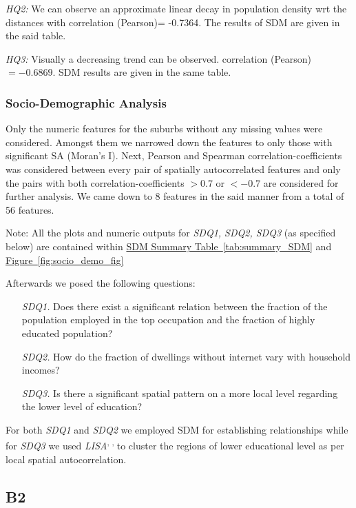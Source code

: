 \documentclass[
	a4paper, %
	10pt, %
	unnumberedsections, %
	twoside, %
]{LTJournalArticle}
\begin{document}
\textit{HQ2:} We can observe an approximate linear decay in population density wrt the distances with correlation (Pearson)= -0.7364. The results of SDM are given in the said table.

\textit{HQ3:} Visually a decreasing trend can be observed. correlation (Pearson)$= -0.6869$. SDM results are given in the same table.


\subsubsection{Socio-Demographic Analysis}
Only the numeric features for the suburbs without any missing values were considered. Amongst them we narrowed down the features to only those with significant SA (Moran's I). Next, Pearson and Spearman correlation-coefficients was considered between every pair of spatially autocorrelated features and only the pairs with both correlation-coefficients  $>0.7$ or $<-0.7$ are considered for further analysis. We came down to 8 features in the said manner from a total of 56 features.

Note: All the plots and numeric outputs for \textit{SDQ1, SDQ2, SDQ3} (as specified below) are contained within \hyperref[tab:summary_SDM]{SDM Summary Table~\ref{tab:summary_SDM}} and \hyperref[fig:socio_demo_fig]{Figure~\ref{fig:socio_demo_fig}}

Afterwards we posed the following questions:

\begin{enumerate}
  \item[\textit{SDQ1.}] Does there exist a significant relation between the fraction of the population employed in the top occupation and the fraction of highly educated population?
  \item[\textit{SDQ2.}] How do the fraction of dwellings without internet vary with household incomes?
  \item[\textit{SDQ3.}] Is there a significant spatial pattern on a more local level regarding the lower level of education? 
\end{enumerate}

For both \textit{SDQ1} and \textit{SDQ2} we employed SDM for establishing relationships while for \textit{SDQ3} we used \textit{LISA}\textsuperscript{\cite{Anselin1995}, \cite{darribasLab_05}, \cite{geodacenterLocalSpatial}} to cluster the regions of lower educational level as per local spatial autocorrelation.

\subsection{B2}
\end{document}
